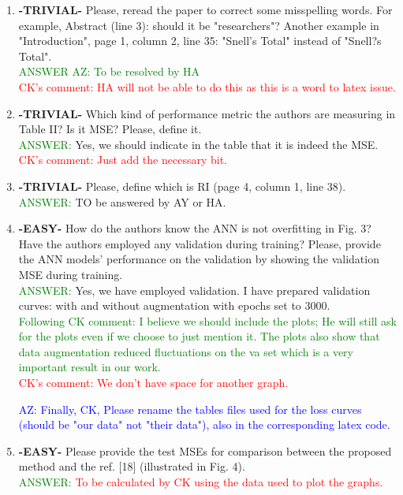 \documentclass{article}
\begin{document}
\begin{enumerate}
    \item \textbf{-TRIVIAL-} Please, reread the paper to correct some misspelling words. For example, Abstract (line 3): should it be "researchers"? Another example in "Introduction", page 1, column 2, line 35: "Snell's Total" instead of "Snell?s Total". \\
    \textcolor{green}{ANSWER AZ: To be resolved by HA} \\ \textcolor{red}{ CK's comment: HA will not be able to do this as this is a word to latex issue.}
    
\item \textbf{-TRIVIAL-} Which kind of performance metric the authors are measuring in Table II? Is it MSE? Please, define it.  \\
\textcolor{green}{ANSWER: } Yes, we should indicate in the table that it is indeed the MSE. \textcolor{red}{ CK's comment: Just add the necessary bit.}

\item \textbf{-TRIVIAL-} Please, define which is RI (page 4, column 1, line 38). \\
\textcolor{green}{ANSWER: } TO be answered by AY or HA.

\item  \textbf{-EASY-} How do the authors know the ANN is not overfitting in Fig. 3? Have the authors employed any validation during training? Please, provide the ANN models' performance on the validation by showing the validation MSE during training. \\
\textcolor{green}{ANSWER: } Yes, we have employed validation. I have prepared validation curves: with and without augmentation with epochs set to 3000.\\ \textcolor{green}{ Following CK comment: I believe we should include the plots; He will still ask for the plots even if we choose to just mention it. The plots also show that data augmentation reduced fluctuations on the va set which is a very important result in our work.} \\ \textcolor{red}{CK's comment: We don't have space for another graph.}

\textcolor{blue}{AZ: Finally, CK, Please rename the tables files used for the loss curves (should be "our data" not "their data"), also in the corresponding latex code.}

\item \textbf{-EASY-} Please provide the test MSEs for comparison between the proposed method and the ref. [18] (illustrated in Fig. 4).   \\
\textcolor{green}{ANSWER: }  \textcolor{red}{To be calculated by CK using the data used to plot the graphs.}
    

\end{enumerate}
\end{document}
